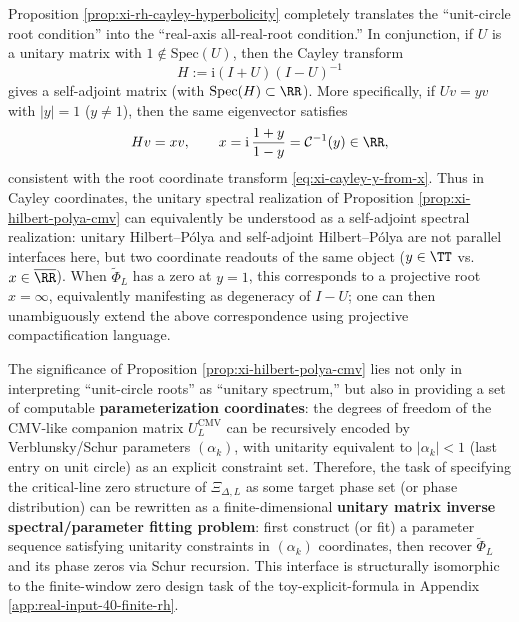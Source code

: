 \begin{remark}\label{rem:xi-cayley-hilbert-polya-unify}
Proposition \ref{prop:xi-rh-cayley-hyperbolicity} completely translates the ``unit-circle root condition'' into the ``real-axis all-real-root condition.''
In conjunction, if \(U\) is a unitary matrix with \(1\notin\mathrm{Spec}(U)\), then the Cayley transform
\[
\boxed{\ H:=\mathrm{i}(I+U)(I-U)^{-1}\ }
\]
gives a self-adjoint matrix (with \(\mathrm{Spec}(H)\subset\RR\)).
More specifically, if \(Uv=yv\) with \(|y|=1\) (\(y\neq 1\)), then the same eigenvector satisfies
\[
Hv=xv,\qquad x=\mathrm{i}\,\frac{1+y}{1-y}=\mathcal{C}^{-1}(y)\in\RR,
\]
consistent with the root coordinate transform \eqref{eq:xi-cayley-y-from-x}.
Thus in Cayley coordinates, the unitary spectral realization of Proposition \ref{prop:xi-hilbert-polya-cmv} can equivalently be understood as a self-adjoint spectral realization: unitary Hilbert--P{\'o}lya and self-adjoint Hilbert--P{\'o}lya are not parallel interfaces here, but two coordinate readouts of the same object (\(y\in\TT\) vs. \(x\in\overline{\RR}\)).
When \(\widetilde\Phi_L\) has a zero at \(y=1\), this corresponds to a projective root \(x=\infty\), equivalently manifesting as degeneracy of \(I-U\); one can then unambiguously extend the above correspondence using projective compactification language.
\end{remark}

\begin{remark}\label{rem:xi-cmv-inverse-spectral}
The significance of Proposition \ref{prop:xi-hilbert-polya-cmv} lies not only in interpreting ``unit-circle roots'' as ``unitary spectrum,'' but also in providing a set of computable \textbf{parameterization coordinates}:
the degrees of freedom of the CMV-like companion matrix \(U_L^{\mathrm{CMV}}\) can be recursively encoded by Verblunsky/Schur parameters \((\alpha_k)\), with unitarity equivalent to \(|\alpha_k|<1\) (last entry on unit circle) as an explicit constraint set.
Therefore, the task of specifying the critical-line zero structure of \(\Xi_{\Delta,L}\) as some target phase set (or phase distribution) can be rewritten as a finite-dimensional \textbf{unitary matrix inverse spectral/parameter fitting problem}:
first construct (or fit) a parameter sequence satisfying unitarity constraints in \((\alpha_k)\) coordinates, then recover \(\widetilde\Phi_L\) and its phase zeros via Schur recursion.
This interface is structurally isomorphic to the finite-window zero design task of the toy-explicit-formula in Appendix \ref{app:real-input-40-finite-rh}.
\end{remark}

